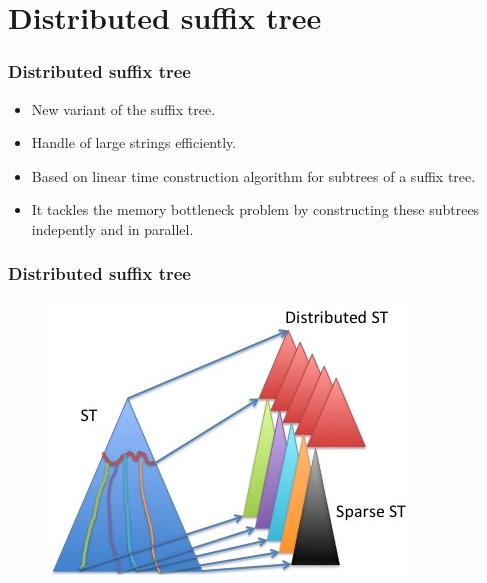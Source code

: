 \documentclass{beamer}
\begin{document}
\section{Distributed suffix tree}
\begin{frame}
\frametitle{Distributed suffix tree}
\begin{block}{}
  \begin{itemize}
    \item New variant of the suffix tree.
    \item Handle of large strings efficiently.
    \item Based on linear time construction algorithm for subtrees of a suffix tree.
    \item It tackles the memory bottleneck problem by constructing these subtrees indepently and in parallel.
  \end{itemize}
\end{block}
\end{frame}
\begin{frame}
  \frametitle{Distributed suffix tree}
  \begin{figure}
    \includegraphics[scale=0.8]{distributed.png}
  \end{figure}
\end{frame}
\end{document}
